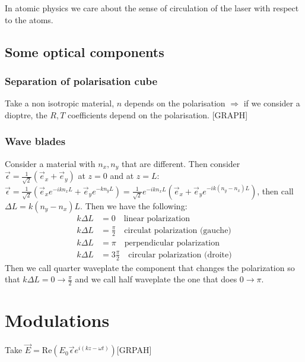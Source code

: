 \documentclass[10pt,a4paper]{book}
\begin{document}
In atomic physics we care about the sense of circulation of the laser with respect to the atoms.
\subsection{Some optical components}
\subsubsection{Separation of polarisation cube}
Take a non isotropic material, $n$ depends on the polarisation $\Rightarrow$ if we consider a dioptre, the $R,T$ coefficients depend on the polarisation. [GRAPH]

\subsubsection{Wave blades}
Consider a material with $n_x,n_y$ that are different. Then consider $\vec{\epsilon}=\frac{1}{\sqrt{2}}(\vec{e}_x+\vec{e}_y)$ at $z=0$ and at $z=L$: $\vec{\epsilon}=\frac{1}{\sqrt{2}}(\vec{e}_xe^{-ikn_xL}+\vec{e}_ye^{-kn_yL})=\frac{1}{\sqrt{2}}e^{-ikn_xL}(\vec{e}_x+\vec{e}_ye^{-ik(n_y-n_x)L})$, then call $\Delta L=k(n_y-n_x)L$. Then we have the following:
\begin{align*}
k\Delta L&=0\quad \text{linear polarization}\\
k\Delta L&=\frac{\pi}{2}\quad \text{circulat polarization (gauche)}\\
k\Delta L&=\pi\quad \text{perpendicular polarization}\\
k\Delta L&=3\frac{\pi}{2}\quad \text{circular polarization (droite)} 
\end{align*}
Then we call quarter waveplate the component that changes the polarization so that $k\Delta L=0\to \frac{\pi}{2}$ and we call half waveplate the one that does $0\to \pi$.

\section{Modulations}
Take $\vec{E}=\text{Re}(E_0\vec{\epsilon}e^{i(kz-\omega t)})$[GRPAH]
\end{document}
